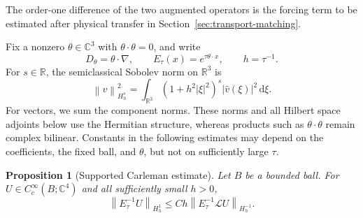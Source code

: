 \documentclass[11pt]{article}
\newcommand{\R}{\mathbb R}
\newcommand{\C}{\mathbb C}
\newcommand{\dd}{\mathrm d}
\newcommand{\norm}[1]{\left\lVert #1\right\rVert}
\newcommand{\abs}[1]{\left\lvert #1\right\rvert}
\newcommand{\Lcal}{\mathcal L}
\newtheorem{proposition}[theorem]{Proposition}
\theoremstyle{remark}
\numberwithin{equation}{section}
\begin{document}
The order-one difference of the two augmented operators is the forcing
term to be estimated after physical transfer in
Section~\ref{sec:transport-matching}.

Fix a nonzero $\theta\in\C^3$ with $\theta\cdot\theta=0$, and write
\begin{equation}
\label{eq:phase-notation}
 D_\theta=\theta\cdot\nabla,\qquad
 E_\tau(x)=e^{\tau\theta\cdot x},\qquad h=\tau^{-1}.
\end{equation}
For $s\in\R$, the semiclassical Sobolev norm on $\R^3$ is
\[
 \norm{v}_{H_h^s}^2
 =\int_{\R^3}(1+h^2\abs{\xi}^2)^s
                    \abs{\widehat v(\xi)}^2\,\dd\xi.
\]
For vectors, we sum the component norms. These norms and all Hilbert
space adjoints below use the Hermitian structure, whereas products
such as $\theta\cdot\theta$ remain complex bilinear. Constants in the
following estimates may depend on the coefficients, the fixed ball,
and $\theta$, but not on sufficiently large $\tau$.

\begin{proposition}[Supported Carleman estimate]
\label{prop:carleman}
Let $B$ be a bounded ball. For $U\in C_c^\infty(B;\C^4)$ and all
sufficiently small $h>0$,
\begin{equation}
\label{eq:augmented-carleman}
 \norm{E_\tau^{-1}U}_{H_h^1}
 \le Ch\norm{E_\tau^{-1}\Lcal U}_{H_h^{-1}}.
\end{equation}
\end{proposition}
\end{document}
